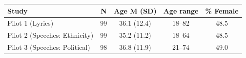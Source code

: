 \begin{table}
\fontsize{12.0pt}{14.4pt}\selectfont
\begin{tabular*}{\linewidth}{@{\extracolsep{\fill}}lcccc}
\toprule
Study & N & Age M (SD) & Age range & \% Female \\ 
\midrule\addlinespace[2.5pt]
Pilot 1 (Lyrics) & 99 & 36.1 (12.4) & 18–82 & 48.5 \\ 
Pilot 2 (Speeches: Ethnicity) & 99 & 35.2 (11.2) & 18–64 & 48.5 \\ 
Pilot 3 (Speeches: Political) & 98 & 36.8 (11.9) & 21–74 & 49.0 \\ 
\bottomrule
\end{tabular*}
\end{table}

